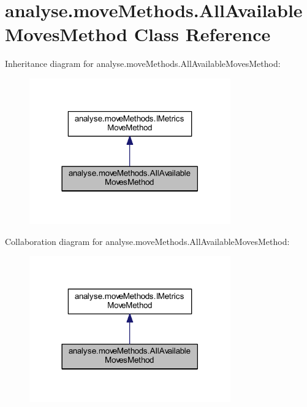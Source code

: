 \hypertarget{classanalyse_1_1move_methods_1_1_all_available_moves_method}{}\section{analyse.\+move\+Methods.\+All\+Available\+Moves\+Method Class Reference}
\label{classanalyse_1_1move_methods_1_1_all_available_moves_method}


Inheritance diagram for analyse.\+move\+Methods.\+All\+Available\+Moves\+Method\+:
\nopagebreak
\begin{figure}[H]
\begin{center}
\leavevmode
\includegraphics[width=246pt]{classanalyse_1_1move_methods_1_1_all_available_moves_method__inherit__graph}
\end{center}
\end{figure}


Collaboration diagram for analyse.\+move\+Methods.\+All\+Available\+Moves\+Method\+:
\nopagebreak
\begin{figure}[H]
\begin{center}
\leavevmode
\includegraphics[width=246pt]{classanalyse_1_1move_methods_1_1_all_available_moves_method__coll__graph}
\end{center}
\end{figure}
